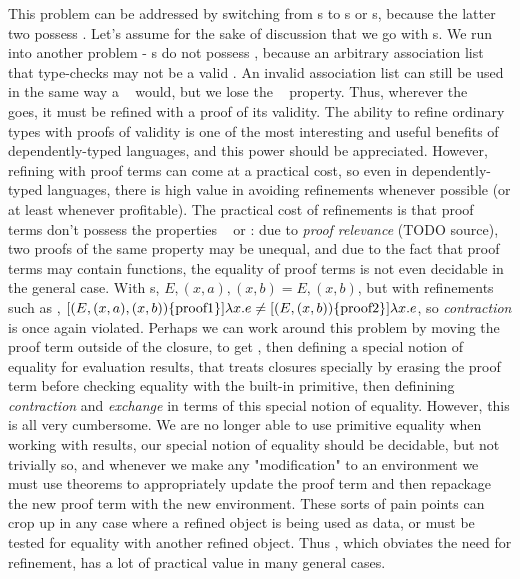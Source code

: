 \documentclass[nonacm]{acmart}
\theoremstyle{slplain}
\numberwithin{thm}{section}
\begin{document}
This problem can be addressed by switching from {\SAL}s to {\cal}s or {\fpf}s, because the latter two possess
\SemInj. Let's assume for the sake of discussion that we go with {\CAL}s. We run into another problem - {\CAL}s
do not possess \SemTot, because an arbitrary association list that type-checks may not be a valid \CAL.
An invalid association list can still be used in the same way a \SAL~ would, but we lose the
\SemInj~ property. Thus, wherever the \CAL~ goes, it must be refined with a proof of its validity. The ability
to refine ordinary types with proofs of validity is one of the most interesting and useful benefits of
dependently-typed languages, and this power should be appreciated. However, refining with proof terms can
come at a practical cost, so even in dependently-typed languages, there is high value in avoiding refinements
whenever possible (or at least whenever profitable). The practical cost of refinements is that proof terms
don't possess the properties \SemInj~ or \EqDec: due to \emph{proof relevance} (TODO source), two proofs of
the same property may be unequal, and due to the fact that proof terms may contain functions, the equality of
proof terms is not even decidable in the general case. With {\CAL}s, \mbox{$E, (x, a), (x, b) = E, (x, b)$},
but with refinements such as ,
\mbox{$[{(E, (x, a), (x, b))}\{\text{proof1}\}]\lambda x . e \ne [{(E, (x, b))}\{\text{proof2}\}]\lambda x . e$},
so \emph{contraction} is once again violated. Perhaps we can work around this problem by moving the proof term
outside of the closure, to get \mbox{}, then defining a
special notion of equality for evaluation results, that treats closures specially by erasing the proof term
before checking equality with the built-in primitive, then definining \emph{contraction} and \emph{exchange}
in terms of this special notion of equality. However, this is all very cumbersome. We are no longer able to
use primitive equality when working with results, our special notion of equality should be decidable, but
not trivially so, and whenever we make any "modification" to an environment we must use theorems
to appropriately update the proof term and then repackage the new proof term with the new environment.
These sorts of pain points can crop up in any case where a refined object is being used as data, or must be
tested for equality with another refined object. Thus \SemTot, which obviates the need for refinement, has
a lot of practical value in many general cases.
\end{document}
